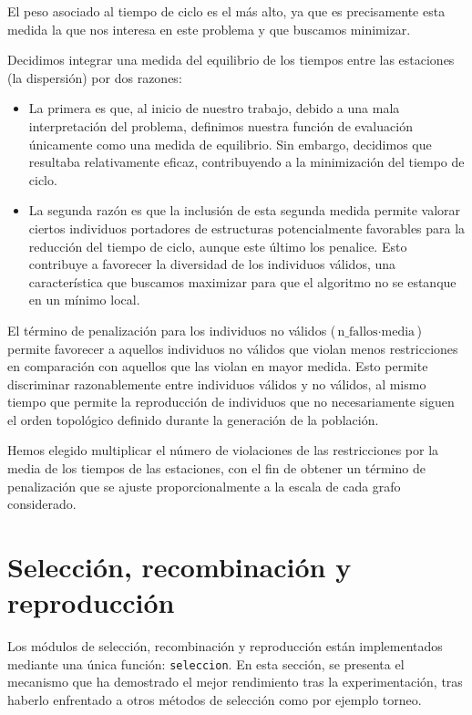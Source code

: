 \documentclass[12pt,a4paper]{report}
\begin{document}
El peso asociado al tiempo de ciclo es el más alto, ya que es precisamente esta medida la que nos interesa en este problema y que buscamos minimizar.

Decidimos integrar una medida del equilibrio de los tiempos entre las estaciones (la dispersión) por dos razones:
\begin{itemize}
    \item La primera es que, al inicio de nuestro trabajo, debido a una mala interpretación del problema, definimos nuestra función de evaluación únicamente como una medida de equilibrio. Sin embargo, decidimos que resultaba relativamente eficaz, contribuyendo a la minimización del tiempo de ciclo.
    \item La segunda razón es que la inclusión de esta segunda medida permite valorar ciertos individuos portadores de estructuras potencialmente favorables para la reducción del tiempo de ciclo, aunque este último los penalice. Esto contribuye a favorecer la diversidad de los individuos válidos, una característica que buscamos maximizar para que el algoritmo no se estanque en un mínimo local.
\end{itemize}



El término de penalización para los individuos no válidos ($\text{n\_fallos} \cdot \text{media}$) permite favorecer a aquellos individuos no válidos que violan menos restricciones en comparación con aquellos que las violan en mayor medida. Esto permite discriminar razonablemente entre individuos válidos y no válidos, al mismo tiempo que permite la reproducción de individuos que no necesariamente siguen el orden topológico definido durante la generación de la población.

Hemos elegido multiplicar el número de violaciones de las restricciones por la media de los tiempos de las estaciones, con el fin de obtener un término de penalización que se ajuste proporcionalmente a la escala de cada grafo considerado.

\section{Selección, recombinación y reproducción}

Los módulos de selección, recombinación y reproducción están implementados mediante una única función: \texttt{seleccion}. En esta sección, se presenta el mecanismo que ha demostrado el mejor rendimiento tras la experimentación, tras haberlo enfrentado a otros métodos de selección como por ejemplo torneo.
\end{document}

